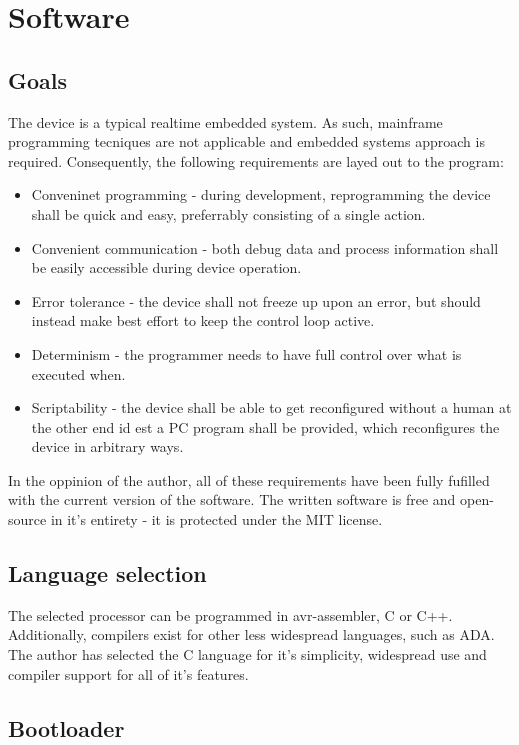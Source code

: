 \section{Software}
\subsection{Goals}
The device is a typical realtime embedded system.
As such, mainframe programming tecniques are not applicable and embedded systems approach is required.
Consequently, the following requirements are layed out to the program:
\begin{itemize}
\item{Conveninet programming - during development, reprogramming the device shall be quick and easy, preferrably consisting of a single action.}
\item{Convenient communication - both debug data and process information shall be easily accessible during device operation.}
\item{Error tolerance - the device shall not freeze up upon an error, but should instead make best effort to keep the control loop active.}
\item{Determinism - the programmer needs to have full control over what is executed when.}
\item{Scriptability - the device shall be able to get reconfigured without a human at the other end id est a PC program shall be provided, which reconfigures the device in arbitrary ways.}
\end{itemize}
In the oppinion of the author, all of these requirements have been fully fufilled with the current version of the software.
The written software is free and open-source in it's entirety - it is protected under the MIT license.

\subsection{Language selection}
The selected processor can be programmed in avr-assembler, C or C++.
Additionally, compilers exist for other less widespread languages, such as ADA.
The author has selected the C language for it's simplicity, widespread use and compiler support for all of it's features.

\subsection{Bootloader}
